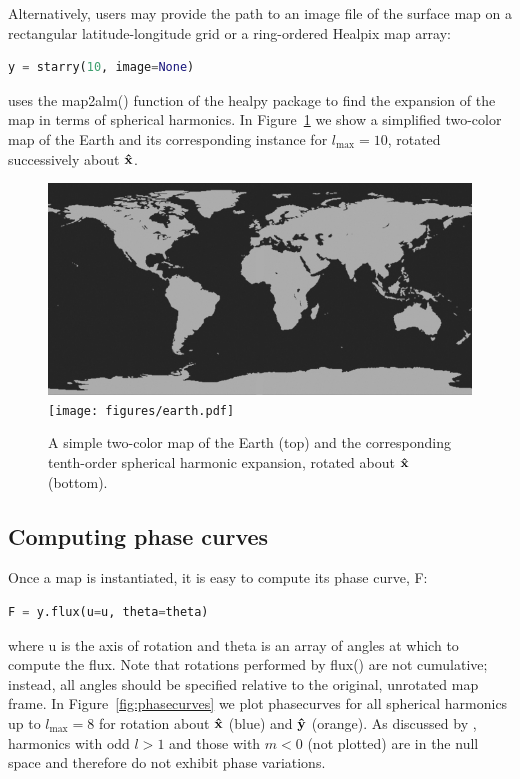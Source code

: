 \documentclass[modern]{aastex61}
\begin{document}
Alternatively, users may provide the path to an image file of the
surface map on a rectangular latitude-longitude grid or a ring-ordered
\textsf{Healpix} map array:
%
\begin{lstlisting}[language=Python]
y = starry(10, image=None)
\end{lstlisting}
%
\starry uses the \textsf{map2alm()} function
of the \textsf{healpy} package to find the expansion of the map in
terms of spherical harmonics. In Figure~\ref{fig:earth} we show a
simplified two-color map of the Earth and its corresponding \starry instance for
$l_\mathrm{max} = 10$, rotated successively about $\mathbf{\hat{x}}$.
%
\begin{figure}[ht!]
    \begin{centering}
    \includegraphics[width=0.8\linewidth]{../starry/maps/earth.jpg}
    \\[1em]
    \texttt{[image: figures/earth.pdf]}
    \caption{\label{fig:earth}
             A simple two-color map of the Earth (top) and the
             corresponding tenth-order spherical harmonic expansion,
             rotated about $\mathbf{\hat{x}}$ (bottom).}
    \end{centering}
\end{figure}
%

\subsection{Computing phase curves}
\label{sec:starryphasecurves}

Once a map is instantiated, it is easy to compute its phase curve, \textsf{F}:
%
\begin{lstlisting}[language=Python]
F = y.flux(u=u, theta=theta)
\end{lstlisting}
%
where \textsf{u} is the axis of rotation and \textsf{theta} is an array of
angles at which to compute the flux. Note that rotations performed
by \textsf{flux()} are not cumulative; instead, all angles should be specified
relative to the original, unrotated map frame.
%
In Figure~\ref{fig:phasecurves} we plot phasecurves for all spherical harmonics
up to $l_\mathrm{max} = 8$ for rotation about $\mathbf{\hat{x}}$ (blue) and $\mathbf{\hat{y}}$
(orange). As discussed by \citet{CowanFuentesHaggard2013}, harmonics with
odd $l > 1$ and those with $m < 0$ (not plotted) are in the null space and
therefore do not exhibit phase variations.
\end{document}
